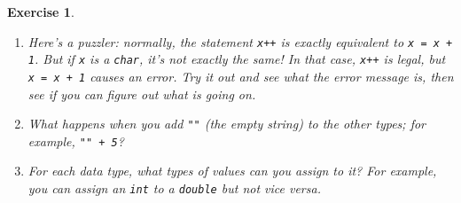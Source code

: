\documentclass[12pt]{book}
\theoremstyle{exercise}
\newtheorem{exercise}{Exercise}[chapter]
\newcommand{\java}[1]{\verb"#1"}
\begin{document}
\begin{exercise}
\begin{enumerate}
\item Here's a puzzler: normally, the statement \java{x++} is exactly equivalent to \java{x = x + 1}.
But if \java{x} is a \java{char}, it's not exactly the same!
In that case, \java{x++} is legal, but \java{x = x + 1} causes an error.
Try it out and see what the error message is, then see if you can figure out what is going on.

\item What happens when you add \verb|""| (the empty string) to the other types; for example, \verb|"" + 5|?

\item For each data type, what types of values can you assign to it?
For example, you can assign an \java{int} to a \java{double} but not vice versa.

\end{enumerate}

\end{exercise}
\end{document}
